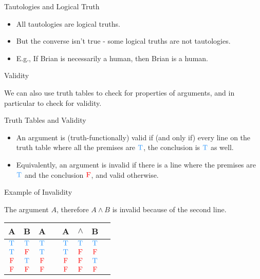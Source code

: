 \documentclass[
  ignorenonframetext,
]{beamer}
\providecommand{\tightlist}{%
  \setlength{\itemsep}{0pt}\setlength{\parskip}{0pt}}
\renewcommand{\,}{\text{, }}
\def\True{\textcolor{dodgerblue}{\text{T}}}
\def\False{\textcolor{red}{\text{F}}}
\begin{document}
\begin{frame}{Tautologies and Logical Truth}
\protect\hypertarget{tautologies-and-logical-truth}{}

\begin{itemize}
\tightlist
\item
  All tautologies are logical truths.
\item
  But the converse isn't true - some logical truths are not tautologies.
\item
  E.g., If Brian is necessarily a human, then Brian is a human.
\end{itemize}

\end{frame}

\begin{frame}{Validity}
\protect\hypertarget{validity}{}

We can also use truth tables to check for properties of arguments, and
in particular to check for validity.

\end{frame}

\begin{frame}{Truth Tables and Validity}
\protect\hypertarget{truth-tables-and-validity}{}

\begin{itemize}[<+->]
\tightlist
\item
  An argument is (truth-functionally) valid if (and only if) every line
  on the truth table where all the premises are \(\True\), the
  conclusion is \(\True\) as well.
\item
  Equivalently, an argument is invalid if there is a line where the
  premises are \(\True\) and the conclusion \(\False\), and valid
  otherwise.
\end{itemize}

\end{frame}

\begin{frame}{Example of Invalidity}
\protect\hypertarget{example-of-invalidity}{}

The argument \(A\), therefore \(A \wedge B\) is invalid because of the
second line.

\begin{center}
\bigskip
\begin{tabular}{@{ }c@{ }@{ }c | c | c@{ }@{ }c@{ }@{ }c@{ }@{ }c@{ }@{ }c}
A & B & A &  & A & $\wedge$ & B & \\
\hline 
$\True$ & $\True$ & \textcolor{red}{$\True$} &  & $\True$ & \textcolor{red}{$\True$} & $\True$ & \\
$\True$ & $\False$ & \textcolor{red}{$\True$} &  & $\True$ & \textcolor{red}{$\False$} & $\False$ & \\
$\False$ & $\True$ & \textcolor{red}{$\False$} &  & $\False$ & \textcolor{red}{$\False$} & $\True$ & \\
$\False$ & $\False$ & \textcolor{red}{$\False$} &  & $\False$ & \textcolor{red}{$\False$} & $\False$ & \\
\end{tabular}
\end{center}

\end{frame}
\end{document}
